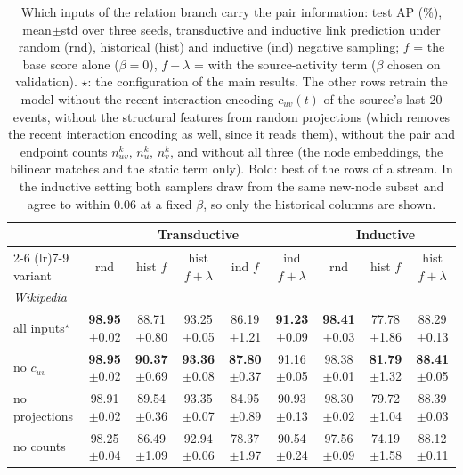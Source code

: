 \begin{table}[p]
\caption{Which inputs of the relation branch carry the pair information: test AP (\%), mean{\scriptsize$\pm$std} over three seeds, transductive and inductive link prediction under random (rnd), historical (hist) and inductive (ind) negative sampling; $f$ = the base score alone ($\beta=0$), $f{+}\lambda$ = with the source-activity term ($\beta$ chosen on validation). $\star$: the configuration of the main results. The other rows retrain the model without the recent interaction encoding $c_{uv}(t)$ of the source's last 20 events, without the structural features from random projections (which removes the recent interaction encoding as well, since it reads them), without the pair and endpoint counts $n_{uv}^k$, $n_u^k$, $n_v^k$, and without all three (the node embeddings, the bilinear matches and the static term only). Bold: best of the rows of a stream. In the inductive setting both samplers draw from the same new-node subset and agree to within 0.06 at a fixed $\beta$, so only the historical columns are shown.}
\label{tab:a4_trunk_channels}
\centering
\scriptsize
\setlength{\tabcolsep}{2pt}
\renewcommand{\arraystretch}{0.92}
\begin{tabular}{lcccccccc}
\toprule
 & \multicolumn{5}{c}{Transductive} & \multicolumn{3}{c}{Inductive} \\
\cmidrule(lr){2-6} \cmidrule(lr){7-9}
variant & rnd & hist $f$ & hist $f{+}\lambda$ & ind $f$ & ind $f{+}\lambda$ & rnd & hist $f$ & hist $f{+}\lambda$ \\
\midrule
\multicolumn{9}{l}{\textit{Wikipedia}} \\
all inputs$^\star$ & \textbf{98.95}{\tiny$\pm$0.02} & 88.71{\tiny$\pm$0.80} & 93.25{\tiny$\pm$0.05} & 86.19{\tiny$\pm$1.21} & \textbf{91.23}{\tiny$\pm$0.09} & \textbf{98.41}{\tiny$\pm$0.03} & 77.78{\tiny$\pm$1.86} & 88.29{\tiny$\pm$0.13} \\
no $c_{uv}$ & \textbf{98.95}{\tiny$\pm$0.02} & \textbf{90.37}{\tiny$\pm$0.69} & \textbf{93.36}{\tiny$\pm$0.08} & \textbf{87.80}{\tiny$\pm$0.37} & 91.16{\tiny$\pm$0.05} & 98.38{\tiny$\pm$0.01} & \textbf{81.79}{\tiny$\pm$1.32} & \textbf{88.41}{\tiny$\pm$0.05} \\
no projections & 98.91{\tiny$\pm$0.02} & 89.54{\tiny$\pm$0.36} & 93.35{\tiny$\pm$0.07} & 84.95{\tiny$\pm$0.89} & 90.93{\tiny$\pm$0.13} & 98.30{\tiny$\pm$0.02} & 79.72{\tiny$\pm$1.04} & 88.39{\tiny$\pm$0.03} \\
no counts & 98.25{\tiny$\pm$0.04} & 86.49{\tiny$\pm$1.09} & 92.94{\tiny$\pm$0.06} & 78.37{\tiny$\pm$1.97} & 90.54{\tiny$\pm$0.24} & 97.56{\tiny$\pm$0.09} & 74.19{\tiny$\pm$1.58} & 88.12{\tiny$\pm$0.11} \\

\end{tabular}
\end{table}
